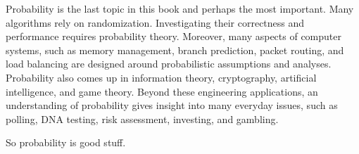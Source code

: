 Probability is the last topic in this book and perhaps the most
important.  Many algorithms rely on randomization.  Investigating
their correctness and performance requires probability theory.
Moreover, many aspects of computer systems, such as memory management,
branch prediction, packet routing, and load balancing are designed
around probabilistic assumptions and analyses.  Probability also comes
up in information theory, cryptography, artificial intelligence, and
game theory.  Beyond these engineering applications, an understanding
of probability gives insight into many everyday issues, such as
polling, DNA testing, risk assessment, investing, and gambling.

So probability is good stuff.

\endinput